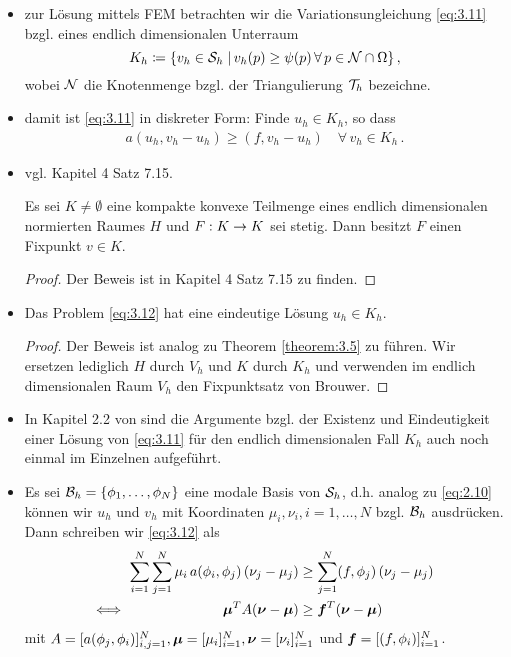 \begin{itemize}
\item zur Lösung mittels FEM betrachten wir die Variationsungleichung \eqref{eq:3.11} bzgl. eines endlich dimensionalen Unterraum
\[
	K_h \coloneqq \{v_h \in \mathcal S_h \;\vert\, v_h (p) \ge \psi(p) \, \forall \, p \in \mathcal N \cap \Omega\}\, ,
\]
wobei $\mathcal N$ die Knotenmenge bzgl. der Triangulierung $\mathcal T_h$ bezeichne.

\item damit ist \eqref{eq:3.11} in diskreter Form: Finde $u_h \in K_h$, so dass
\begin{align}\label{eq:3.12}
	a(u_h,v_h-u_h) \ge (f,v_h-u_h) \quad \forall \, v_h \in K_h \, .
\end{align}

\item vgl. \cite{Werner} Kapitel 4 Satz 7.15.
\begin{satz}
Es sei $K \not= \emptyset$ eine kompakte konvexe Teilmenge eines endlich dimensionalen normierten Raumes $H$ und $F: K \rightarrow K$ sei stetig. Dann besitzt $F$ einen Fixpunkt $v \in K$.
\end{satz}

\begin{proof}
Der Beweis ist in \cite{Werner} Kapitel 4 Satz 7.15 zu finden.
\end{proof}

\item \begin{theorem}
Das Problem \eqref{eq:3.12} hat eine eindeutige Lösung $u_h \in K_h$.
\end{theorem}

\begin{proof}
Der Beweis ist analog zu Theorem \ref{theorem:3.5} zu führen. Wir ersetzen lediglich $H$ durch $V_h$ und $K$ durch $K_h$ und verwenden im endlich dimensionalen Raum $V_h$ den Fixpunktsatz von Brouwer.
\end{proof}

\item \begin{bem*}
In Kapitel 2.2 von \cite{StarkePDE} sind die Argumente bzgl. der Existenz und Eindeutigkeit einer Lösung von \eqref{eq:3.11} für den endlich dimensionalen Fall $K_h$ auch noch einmal im Einzelnen aufgeführt.
\end{bem*}

\item Es sei $\mathcal B_h = \{\phi_1,\ldots,\phi_N\}$ eine modale Basis von $\mathcal S_h$, d.h. analog zu \eqref{eq:2.10} können wir $u_h$ und $v_h$ mit Koordinaten $\mu_i,\nu_i, i = 1,\ldots,N$ bzgl. $\mathcal B_h$ ausdrücken. Dann schreiben wir \eqref{eq:3.12} als
\begin{align*}
	\sum_{i = 1}^N\sum_{j=1}^N \mu_i \, a(\phi_i,\phi_j)\, (\nu_j-\mu_j) & \ge \sum_{j=1}^N  (f,\phi_j) \, (\nu_j-\mu_j)  \\
	\Longleftrightarrow\quad \qquad  \qquad \qquad \boldsymbol \mu^T A (\boldsymbol \nu- \boldsymbol\mu) &  \ge \boldsymbol f^T (\boldsymbol \nu-\boldsymbol \mu)
\end{align*}
mit $A = [a(\phi_j,\phi_i)]_{i,j=1}^N, \boldsymbol \mu = [\mu_i]_{i=1}^N,\boldsymbol \nu = [\nu_i]_{i=1}^N$ und $\boldsymbol f = [(f,\phi_i)]_{i=1}^N$.


\end{itemize}
